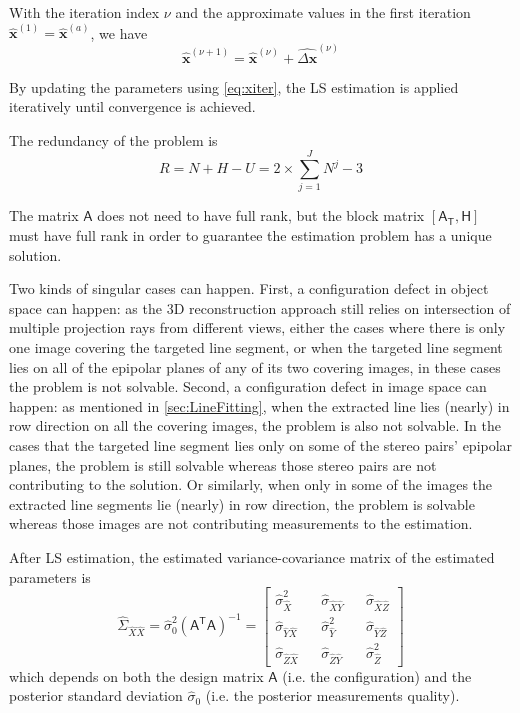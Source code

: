 With the iteration index $\nu$ and the approximate values in the first iteration $\widehat{\boldsymbol x}^{(1)}=\widehat{\boldsymbol x}^{(a)}$, we have
\begin{equation}\label{eq:xiter}
	\widehat{\boldsymbol x}^{(\nu+1)}=
	\widehat{\boldsymbol x}^{(\nu)}+
	\widehat{\Delta\boldsymbol x}^{(\nu)}
\end{equation}

By updating the parameters using \cref{eq:xiter}, the LS estimation is applied iteratively until convergence is achieved. 


The redundancy of the problem is
\begin{equation}
R=N+H-U=2\times\displaystyle\sum_{j=1}^{J}N^j-3
\end{equation}

The matrix $\mathsf{A}$ does not need to have full rank, but the block matrix $[\mathsf{A_T},\mathsf{H}]$ must have full rank in order to guarantee the estimation problem has a unique solution.


\clearpage
Two kinds of singular cases can happen. First, a configuration defect in object space can happen: as the 3D reconstruction approach still relies on intersection of multiple projection rays from different views, either the cases where there is only one image covering the targeted line segment, or when the targeted line segment lies on all of the epipolar planes of any of its two covering images, in these cases the problem is not solvable. Second, a configuration defect in image space can happen: as mentioned in \cref{sec:LineFitting}, when the extracted line lies (nearly) in row direction on all the covering images, the problem is also not solvable. In the cases that the targeted line segment lies only on some of the stereo pairs' epipolar planes, the problem is still solvable whereas those stereo pairs are not contributing to the solution. Or similarly, when only in some of the images the extracted line segments lie (nearly) in row direction, the problem is solvable whereas those images are not contributing measurements to the estimation.




After LS estimation, the estimated variance-covariance matrix of the estimated parameters is
\begin{equation}
\hat{\Sigma}_{\hat{X}\hat{X}}=\hat{\sigma}_0^2(\mathsf{A^TA})^{-1}=
\begin{bmatrix}
\hat{\sigma}_{\hat{X}}^2 && \hat{\sigma}_{\hat{X}\hat{Y}} && \hat{\sigma}_{\hat{X}\hat{Z}} \\
\hat{\sigma}_{\hat{Y}\hat{X}} && \hat{\sigma}_{\hat{Y}}^2 && \hat{\sigma}_{\hat{Y}\hat{Z}} \\
\hat{\sigma}_{\hat{Z}\hat{X}} && \hat{\sigma}_{\hat{Z}\hat{Y}} && \hat{\sigma}_{\hat{Z}}^2
\end{bmatrix}
\end{equation}
which depends on both the design matrix $\mathsf{A}$ (i.e. the configuration) and the posterior standard deviation $\hat{\sigma}_0$ (i.e. the posterior measurements quality).



